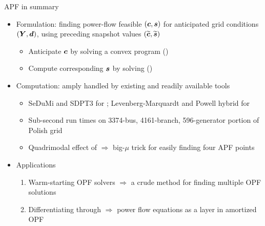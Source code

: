 \begin{frame}[t]{APF in summary}{}
    \begin{itemize}
        \item \textcolor<1>{CornellRed}{Formulation}:
            finding power-flow feasible \(\left(\boldsymbol{c},\boldsymbol{s}\right)\)
            for anticipated grid conditions \(\left(\boldsymbol{Y},\boldsymbol{d}\right)\),
            using preceding snapshot values \(\left(\widetilde{\boldsymbol{c}},\widetilde{\boldsymbol{s}}\right)\)
        \begin{itemize}
            \item Anticipate \(\boldsymbol{c}\) by solving a convex program
                \textcolor<1>{CornellRed}{\XED[full]} (\XED)
            \item Compute corresponding \(\boldsymbol{s}\) by solving
                \textcolor<1>{CornellRed}{\APFE[full]} (\APFE)
        \end{itemize}

        \vspace{0.5em}
        \item \textcolor<2>{CornellRed}{Computation}:
            amply handled by existing and readily available tools
        \begin{itemize}
            \item SeDuMi and SDPT3 for \XED;
                Levenberg-Marquardt and Powell hybrid for \APFE
            \item \textcolor<2>{CornellRed}{Sub-second run times}
                on 3374-bus, 4161-branch, 596-generator portion of Polish grid
            \item \textcolor<2>{CornellRed}{Quadrimodal effect} of \XED
                \(\Longrightarrow\)
                \textcolor<2>{CornellRed}{big-\(\mu\) trick} for easily finding four APF points
        \end{itemize}

        \vspace{0.5em}
        \item \textcolor<3>{CornellRed}{Applications}
        \begin{enumerate}
            \item Warm-starting OPF solvers
                \(\Longrightarrow\)
                \textcolor<3>{CornellRed}{a crude method for finding multiple OPF solutions}

            \item Differentiating through \APFE
                \(\Longrightarrow\)
                \textcolor<3>{CornellRed}{power flow equations as a layer in amortized OPF}
        \end{enumerate}
    \end{itemize}
\end{frame}
